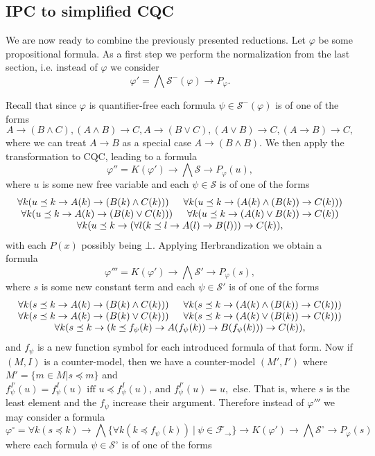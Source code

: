 \documentclass[a4paper,12pt]{report}
\theoremstyle{definition}
\theoremstyle{definition}
\theoremstyle{definition}
\theoremstyle{definition}
\theoremstyle{definition}
\theoremstyle{definition}
\theoremstyle{definition}
\begin{document}
	\subsection{IPC to simplified CQC}
	
	We are now ready to combine the previously presented reductions.
	Let $\varphi$ be some propositional formula. As a first step we perform the normalization from the last section, i.e. instead of $\varphi$ we consider $$\varphi' = \bigwedge \mathcal S^-(\varphi)\to P_\varphi.$$
	
	Recall that since $\varphi$ is quantifier-free each formula $\psi\in\mathcal S^-(\varphi)$ is of one of the forms
	$$A\to (B\wedge C), (A\wedge B)\to C, A\to (B\vee C), (A\vee B)\to C, (A\to B)\to C,$$
	where we can treat $A\to B$ as a special case $A\to (B\wedge B)$. We then apply the transformation to CQC, leading to a formula
	$$\varphi'' = K(\varphi')\to\bigwedge  \mathcal S\to P_\varphi(u),$$
	where $u$ is some new free variable and each $\psi\in\mathcal S$ is of one of the forms
	$$\begin{matrix}
		\forall k(u\preceq k\to A(k)\to (B(k)\wedge C(k)))\indent  \forall k(u\preceq k\to (A(k)\wedge (B(k))\to C(k)))\\
		\forall k(u\preceq k\to A(k)\to (B(k)\vee C(k)))\indent \forall k(u\preceq k\to (A(k)\vee B(k))\to C(k))\\
		\forall k(u\preceq k\to (\forall l(k\preceq l \to A(l)\to B(l)))\to C(k)),
	\end{matrix}$$
	with each $P(x)$ possibly being $\bot$. Applying Herbrandization we obtain a formula
	$$\varphi''' = K(\varphi')\to \bigwedge \mathcal S'\to P_\varphi(s),$$
	where $s$ is some new constant term and each $\psi\in\mathcal S'$ is of one of the forms
	$$\begin{matrix}
		\forall k(s\preceq k\to A(k)\to (B(k)\wedge C(k)))\indent \forall k(s\preceq k\to (A(k)\wedge (B(k))\to C(k)))\\
		\forall k(s\preceq k\to A(k)\to (B(k)\vee C(k)))\indent \forall k(s\preceq k\to (A(k)\vee (B(k))\to C(k)))\\
		\forall k(s\preceq k\to (k\preceq f_\psi(k) \to A(f_\psi(k))\to B(f_\psi(k)))\to C(k)),\\
	\end{matrix}$$
	and $f_\psi$ is a new function symbol for each introduced formula of that form. Now if $(M, I)$ is a counter-model, then we have a counter-model $(M',I')$ where $M' = \{m\in M|s\preceq m\}$ and
	$f_\psi^{I'}(u) = f^I_\psi(u) \text{ iff $u\preceq f^{I}_\psi(u)$, and $f_\psi^{I'}(u) = u,$ else.}$ That is, where $s$ is the least element and the $f_\psi$ increase their argument. Therefore instead of $\varphi'''$ we may consider a formula $$\varphi^\circ = \forall k(s\preceq k)\to \bigwedge\{\forall k(k\preceq f_\psi(k))\:|\:\psi\in\mathcal F_\to\}\to K(\varphi')\to \bigwedge \mathcal S^\circ\to P_\varphi(s)$$ where each formula $\psi\in\mathcal S^\circ$ is of one of the forms
\end{document}
